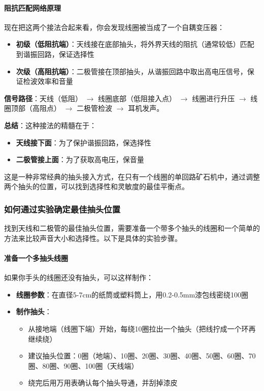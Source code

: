\documentclass[12pt,UTF8]{ctexbook}
\begin{document}
\paragraph{阻抗匹配网络原理}

现在把这两个接法合起来看，你会发现线圈被当成了一个自耦变压器：
\begin{itemize}[leftmargin=3.5em]
	\item \textbf{初级（低阻抗端）}：天线接在底部抽头，将外界天线的阻抗（通常较低）匹配到谐振回路，保证选择性
	\item \textbf{次级（高阻抗端）}：二极管接在顶部抽头，从谐振回路中取出高电压信号，保证检波效率和音量
\end{itemize}

\textbf{信号路径}：天线（低阻） $\rightarrow$ 线圈底部（低阻接入点） $\rightarrow$ 线圈进行升压 $\rightarrow$ 线圈顶部（高阻点） $\rightarrow$ 二极管检波 $\rightarrow$ 耳机发声。

\textbf{总结}：这种接法的精髓在于：
\begin{itemize}[leftmargin=3.5em]
	\item \textbf{天线接下面}：为了保护谐振回路，保选择性
	\item \textbf{二极管接上面}：为了获取高电压，保音量
\end{itemize}

这是一种非常经典的抽头接入方式，在只有一个线圈的单回路矿石机中，通过调整两个抽头的位置，可以找到选择性和灵敏度的最佳平衡点。

\subsubsection{如何通过实验确定最佳抽头位置}

找到天线和二极管的最佳抽头位置，需要准备一个带多个抽头的线圈和一个简单的方法来比较声音大小和选择性。以下是具体的实验步骤。

\paragraph{准备一个多抽头线圈}

如果你手头的线圈还没有抽头，可以这样制作：
\begin{itemize}[leftmargin=3.5em]
	\item \textbf{线圈参数}：在直径5-7cm的纸筒或塑料筒上，用0.2-0.5mm漆包线密绕100圈
	\item \textbf{制作抽头}：
	\begin{itemize}[leftmargin=3.5em]
		\item 从接地端（线圈下端）开始，每绕10圈拉出一个抽头（把线拧成一个环再继续绕）
		\item 建议抽头位置：0圈（地端）、10圈、20圈、30圈、40圈、50圈、60圈、70圈、80圈、90圈、100圈（天线端）
		\item 绕完后用万用表确认每个抽头导通，并刮掉漆皮
	\end{itemize}
\end{itemize}
\end{document}

